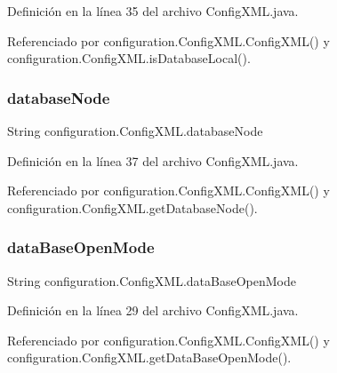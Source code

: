 Definición en la línea 35 del archivo Config\+X\+M\+L.\+java.



Referenciado por configuration.\+Config\+X\+M\+L.\+Config\+X\+M\+L() y configuration.\+Config\+X\+M\+L.\+is\+Database\+Local().

\mbox{\label{classconfiguration_1_1ConfigXML_a71b31518e099bee7f0eefa043b38d706}} 
\subsubsection{\texorpdfstring{databaseNode}{databaseNode}}
{\footnotesize\ttfamily String configuration.\+Config\+X\+M\+L.\+database\+Node\hspace{0.3cm}{\ttfamily [private]}}



Definición en la línea 37 del archivo Config\+X\+M\+L.\+java.



Referenciado por configuration.\+Config\+X\+M\+L.\+Config\+X\+M\+L() y configuration.\+Config\+X\+M\+L.\+get\+Database\+Node().

\mbox{\label{classconfiguration_1_1ConfigXML_afaa301de70783638240f5a9a147f615f}} 
\subsubsection{\texorpdfstring{dataBaseOpenMode}{dataBaseOpenMode}}
{\footnotesize\ttfamily String configuration.\+Config\+X\+M\+L.\+data\+Base\+Open\+Mode\hspace{0.3cm}{\ttfamily [private]}}



Definición en la línea 29 del archivo Config\+X\+M\+L.\+java.



Referenciado por configuration.\+Config\+X\+M\+L.\+Config\+X\+M\+L() y configuration.\+Config\+X\+M\+L.\+get\+Data\+Base\+Open\+Mode().

\mbox{\label{classconfiguration_1_1ConfigXML_a3766a24ed4f1ffda3f6af14b90100656}} 

